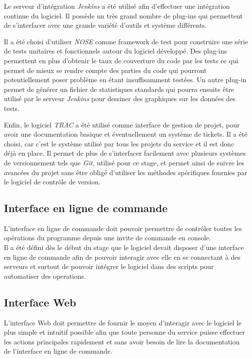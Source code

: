 \documentclass[12pt,a4paper,twoside]{report}
\begin{document}
Le serveur d’intégration \emph{Jenkins} a été utilisé afin d’effectuer une
intégration continue du logiciel. Il possède un très grand nombre de plug-ins
qui permettent de s’interfacer avec une grande variété d’outils et système
différents.

Il a été choisi d’utiliser \emph{NOSE} comme framework de test pour construire
une série de tests unitaires et fonctionnels autour du logiciel développé. Des
plug-ins permettent en plus d’obtenir le taux de couverture du code par les
tests ce qui permet de mieux se rendre compte des parties du code qui pourront
potentiellement poser problème en étant insuffisamment testées. Un autre
plug-in permet de générer un fichier de statistiques standards qui pourra
ensuite être utilisé par le serveur \emph{Jenkins} pour dessiner des graphiques
sur les données des tests.

Enfin, le logiciel \emph{TRAC} a été utilisé comme interface de gestion de
projet, pour avoir une documentation basique et éventuellement un système de
tickets. Il a été choisi, car c’est le système utilisé par tous les projets du
service et il est donc déjà en place. Il permet de plus de s’interfacer
facilement avec plusieurs systèmes de versionnement tels que \emph{Git,}
utilisé pour ce stage, et permet ainsi de suivre les avancées du projet sans
être obligé d’utiliser les méthodes spécifiques fournies par le logiciel de
contrôle de version.\\

\subsection{Interface en ligne de commande}

L’interface en ligne de commande doit pouvoir permettre de contrôler toutes les
opérations du programme depuis une invite de commande en console.\\

Il a été défini dès le début du stage que le logiciel devait disposer d’une
interface en ligne de commande afin de pouvoir interagir avec elle en se
connectant à des serveurs et surtout de pouvoir intégrer le logiciel dans des
scripts pour automatiser des operations.

\subsection{Interface Web}

L’interface Web doit permettre de fournir le moyen d’interagir avec le
logiciel le plus simple et intuitif possible afin que toute personne
du service puisse effectuer les actions principales rapidement et sans avoir
besoin de lire la documentation de l’interface en ligne de commande.
\end{document}
